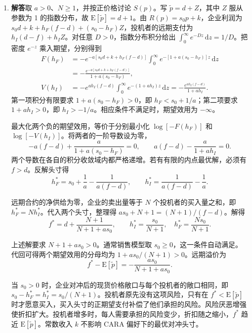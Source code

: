 \begin{solution}[blank-type=manual,blank-vsep=12\baselineskip]
\begin{enumerate}[label=(\alph*)]
\item \textbf{解答}\quad 取 $a>0$、$N\ge1$，并按正价格讨论 $S(p)$。写 $\widetilde p=d+Z$，其中 $Z$ 服从参数为 1 的指数分布，故 $\mathrm E[\widetilde p]=d+1$。由 $R(p)=s_0p+k$，企业利润为 $s_0d+k+h_F(f-d)+(s_0-h_F)Z$，投机者的远期支付为 $h_I(d-f)+h_IZ$。对任意 $D>0$，指数分布积分给出 $\int_0^\infty e^{-Dz}\,\mathrm dz=1/D$。把密度 $e^{-z}$ 乘入期望，分别得到
\[
 \begin{aligned}
 F(h_F)&=-e^{-a[s_0d+k+h_F(f-d)]}
     \int_0^\infty e^{-[1+a(s_0-h_F)]z}\,\mathrm dz\\
 &=-\frac{e^{-a[s_0d+k+h_F(f-d)]}}{1+a(s_0-h_F)},\\
 V(h_I)&=-e^{ah_I(f-d)}
     \int_0^\infty e^{-(1+ah_I)z}\,\mathrm dz
 =-\frac{e^{ah_I(f-d)}}{1+ah_I}.
 \end{aligned}
\]
第一项积分有限要求 $1+a(s_0-h_F)>0$，即 $h_F<s_0+1/a$；第二项要求 $1+ah_I>0$，即 $h_I>-1/a$。相应条件不满足时，期望效用为 $-\infty$。

最大化两个负的期望效用，等价于分别最小化 $\log[-F(h_F)]$ 和 $\log[-V(h_I)]$。将两者的一阶导数设为零，
\[
 -a(f-d)+\frac{a}{1+a(s_0-h_F)}=0,\qquad
 a(f-d)-\frac{a}{1+ah_I}=0.
\]
两个导数在各自的积分收敛域内都严格递增。若有有限的内点最优解，必须有 $f>d$。反解头寸得
\[
 h_F^*=s_0+\frac1a-\frac1{a(f-d)},\qquad
 h_I^*=\frac1{a(f-d)}-\frac1a.
\]

远期合约的净供给为零，企业的卖出量等于 $N$ 个投机者的买入量之和，即 $h_F^*=Nh_I^*$。代入两个头寸，整理得 $as_0+N+1=(N+1)/(f-d)$。解得
\[
 \boxed{f^*=d+\frac{N+1}{N+1+as_0}},\qquad
 h_I^*=\frac{s_0}{N+1},\quad h_F^*=\frac{Ns_0}{N+1}.
\]

上述解要求 $N+1+as_0>0$。通常销售模型取 $s_0\ge0$，这一条件自动满足。代回可得两个期望效用的分母均为 $1+as_0/(N+1)>0$。远期溢价为
\[
 \boxed{f^*-\mathrm E[\widetilde p]
 =-\frac{as_0}{N+1+as_0}}.
\]

当 $s_0>0$ 时，企业对冲后的现货价格敞口与每个投机者的敞口相同，即 $s_0-h_F^*=h_I^*=s_0/(N+1)$。投机者原先没有这项风险，只有在 $f^*<\mathrm E[\widetilde p]$ 时才愿意买入，买入头寸的正期望支付补偿了他们承担的风险。风险厌恶增强使折扣扩大。投机者增多时，每人需要承担的风险变少，折扣随之缩小，$f^*$ 趋近 $\mathrm E[\widetilde p]$。常数收入 $k$ 不影响 CARA 偏好下的最优对冲头寸。
\end{enumerate}
\end{solution}

